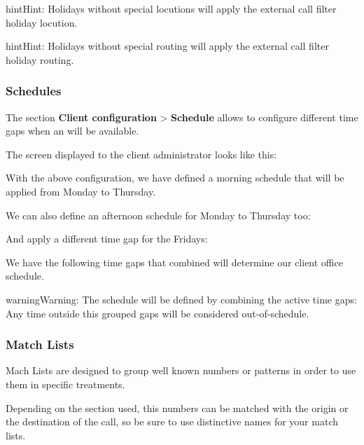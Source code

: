 \documentclass[letterpaper,10pt,english]{sphinxmanual}
\begin{document}
\begin{notice}{hint}{Hint:}
Holidays without special locutions will apply the external call filter
holiday locution.
\end{notice}

\begin{notice}{hint}{Hint:}
Holidays without special routing will apply the external call filter
holiday routing.
\end{notice}


\subsubsection{Schedules}
\label{administration_portal/client/vpbx/routing_tools/schedules::doc}\label{administration_portal/client/vpbx/routing_tools/schedules:schedules}
The section \textbf{Client configuration} \textgreater{} \textbf{Schedule} allows to configure
different time gaps when an {\hyperref[administration_portal/client/vpbx/ddis:ddis]{}} will be available.

The screen displayed to the client administrator looks like this:

With the above configuration, we have defined a morning schedule that will be
applied from Monday to Thursday.

We can also define an afternoon schedule for Monday to Thursday too:

And apply a different time gap for the Fridays:

We have the following time gaps that combined will determine our client
office schedule.

\begin{notice}{warning}{Warning:}
The schedule will be defined by combining the active time gaps:
Any time outside this grouped gaps will be considered out-of-schedule.
\end{notice}


\subsubsection{Match Lists}
\label{administration_portal/client/vpbx/routing_tools/match_lists:match-lists}\label{administration_portal/client/vpbx/routing_tools/match_lists::doc}\label{administration_portal/client/vpbx/routing_tools/match_lists:id1}
Mach Lists are designed to group well known numbers or patterns in order to use
them in specific treatments.

Depending on the section used, this numbers can be matched with the origin or
the destination of the call, so be sure to use distinctive names for your match
lists.
\end{document}
